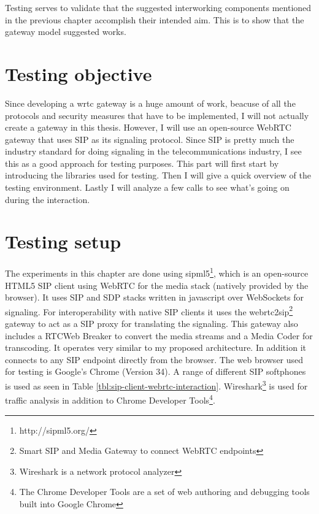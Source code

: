 



Testing serves to validate that the suggested interworking components mentioned in the previous chapter accomplish their intended aim. This is to show that the gateway model suggested works.

\section{Testing objective}
Since developing a \gls{wrtc} gateway is a huge amount of work, beacuse of all the protocols and security measures that have to be implemented, I will not actually create a gateway in this thesis. However, I will use an open-source WebRTC gateway that uses SIP as its signaling protocol. Since SIP is pretty much the industry standard for doing signaling in the telecommunications industry, I see this as a good approach for testing purposes. This part will first start by introducing the libraries used for testing. Then I will give a quick overview of the testing environment. Lastly I will analyze a few calls to see what's going on during the interaction.

\section{Testing setup}
The experiments in this chapter are done using sipml5\footnote{http://sipml5.org/}, which is an open-source HTML5 SIP client using WebRTC for the media stack (natively provided by the browser). It uses SIP and SDP stacks written in javascript over WebSockets for signaling. For interoperability with native SIP clients it uses the webrtc2sip\footnote{Smart SIP and Media Gateway to connect WebRTC endpoints} gateway to act as a SIP proxy for translating the signaling. This gateway also includes a RTCWeb Breaker to convert the media streams and a Media Coder for transcoding. It operates very similar to my proposed architecture. In addition it connects to any SIP endpoint directly from the browser. The web browser used for testing is Google's Chrome (Version 34). A range of different SIP softphones is used as seen in Table \ref{tbl:sip-client-webrtc-interaction}. Wireshark\footnote{Wireshark is a network protocol analyzer} is used for traffic analysis in addition to Chrome Developer Tools\footnote{The Chrome Developer Tools are a set of web authoring and debugging tools built into Google Chrome}.

